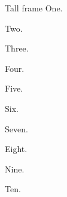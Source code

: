 \documentclass[20pt,aspectratio=169]{beamer}
\date{}
\begin{document}
\begin{frame}[t]{Tall frame}
One.\par Two.\par Three.\par Four.\par Five.\par
Six.\par Seven.\par Eight.\par Nine.\par Ten.
\end{frame}
\end{document}
